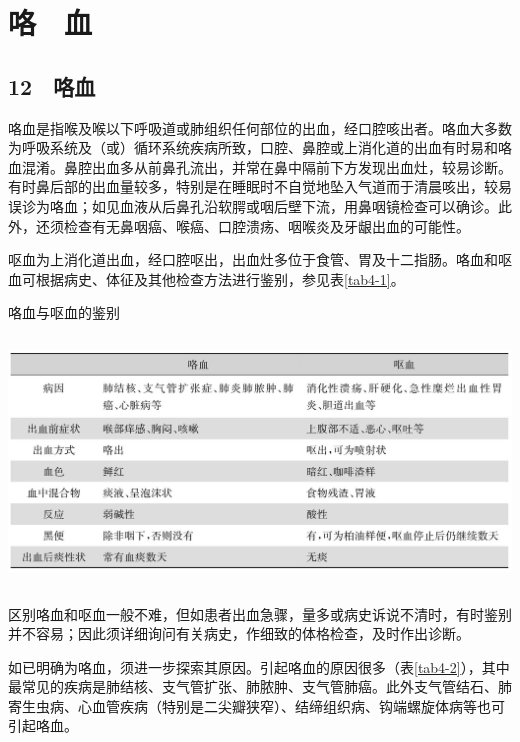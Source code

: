 \chapter{咯　血}

\section{12　咯血}

咯血是指喉及喉以下呼吸道或肺组织任何部位的出血，经口腔咳出者。咯血大多数为呼吸系统及（或）循环系统疾病所致，口腔、鼻腔或上消化道的出血有时易和咯血混淆。鼻腔出血多从前鼻孔流出，并常在鼻中隔前下方发现出血灶，较易诊断。有时鼻后部的出血量较多，特别是在睡眠时不自觉地坠入气道而于清晨咳出，较易误诊为咯血；如见血液从后鼻孔沿软腭或咽后壁下流，用鼻咽镜检查可以确诊。此外，还须检查有无鼻咽癌、喉癌、口腔溃疡、咽喉炎及牙龈出血的可能性。

呕血为上消化道出血，经口腔呕出，出血灶多位于食管、胃及十二指肠。咯血和呕血可根据病史、体征及其他检查方法进行鉴别，参见表\ref{tab4-1}。

\begin{table}[htbp]
\centering
\caption{咯血与呕血的鉴别}
\label{tab4-1}
\includegraphics[width=5.89583in,height=2.59375in]{./images/Image00038.jpg}
\end{table}

区别咯血和呕血一般不难，但如患者出血急骤，量多或病史诉说不清时，有时鉴别并不容易；因此须详细询问有关病史，作细致的体格检查，及时作出诊断。

如已明确为咯血，须进一步探索其原因。引起咯血的原因很多（表\ref{tab4-2}），其中最常见的疾病是肺结核、支气管扩张、肺脓肿、支气管肺癌。此外支气管结石、肺寄生虫病、心血管疾病（特别是二尖瓣狭窄）、结缔组织病、钩端螺旋体病等也可引起咯血。

